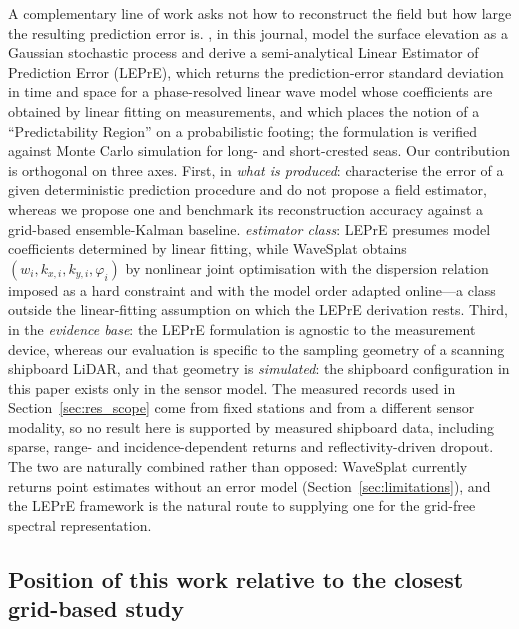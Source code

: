 \documentclass[review]{elsarticle}
\begin{document}
A complementary line of work asks not how to reconstruct the field but how large
the resulting prediction error is.  \citet{fucile2018}, in this journal, model
the surface elevation as a Gaussian stochastic process and derive a
semi-analytical Linear Estimator of Prediction Error (LEPrE), which returns the
prediction-error standard deviation in time and space for a phase-resolved
linear wave model whose coefficients are obtained by linear fitting on
measurements, and which places the notion of a ``Predictability Region'' on a
probabilistic footing; the formulation is verified against Monte Carlo
simulation for long- and short-crested seas.  Our contribution is orthogonal on
three axes.  First, in \emph{what is produced}: \citet{fucile2018} characterise
the error of a given deterministic prediction procedure and do not propose a
field estimator, whereas we propose one and benchmark its reconstruction
accuracy against a grid-based ensemble-Kalman baseline.
\emph{estimator class}: LEPrE presumes model coefficients determined by linear
fitting, while WaveSplat obtains $(w_i,k_{x,i},k_{y,i},\varphi_i)$ by nonlinear
joint optimisation with the dispersion relation imposed as a hard constraint and
with the model order adapted online---a class outside the linear-fitting
assumption on which the LEPrE derivation rests.  Third, in the \emph{evidence
base}: the LEPrE formulation is agnostic to the measurement device, whereas our
evaluation is specific to the sampling geometry of a scanning shipboard LiDAR,
 and that geometry is \emph{simulated}: the shipboard configuration in this paper
exists only in the sensor model. The measured records used in
Section~\ref{sec:res_scope} come from fixed stations and from a different sensor
modality, so no result here is supported by measured shipboard data,
including sparse, range- and incidence-dependent returns and reflectivity-driven
dropout.  The two are naturally combined rather than opposed: WaveSplat
currently returns point estimates without an error model
(Section~\ref{sec:limitations}), and the LEPrE framework is the natural route to
supplying one for the grid-free spectral representation.

\subsection{Position of this work relative to the closest grid-based study}
\label{sec:rel_wang}
\end{document}
